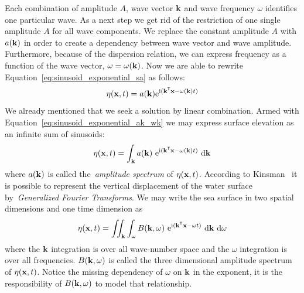Each combination of amplitude $A$, wave vector $\mathbf{k}$ and wave frequency
$\omega$ identifies one particular wave. As a next step we get rid of the
restriction of one single amplitude $A$ for all wave components. We replace the
constant amplitude $A$ with $a(\mathbf{k})$ in order to create a dependency
between wave vector and wave amplitude. Furthermore, because of the dispersion
relation, we can express frequency as a function of the wave vector, $\omega =
\omega(\mathbf{k})$. Now we are able to rewrite
Equation~\ref{eq:sinusoid_exponential_sa} as follows:
\begin{equation}
\label{eq:sinusoid_exponential_ak_wk}
\eta(\mathbf{x}, t) =
a(\mathbf{k})\mathrm{e}^{\mathrm{i}(\mathbf{k}^{\mathsf{T}}\mathbf{x}-
\omega(\mathbf{k})t)}
\end{equation}
%
We already mentioned that we seek a solution by linear combination. Armed with
Equation~\ref{eq:sinusoid_exponential_ak_wk} we may express surface
elevation as an infinite sum of sinusoids:
\begin{equation}
\label{eq:surface_elevation_akwt}
 \eta(\mathbf{x}, t) = \int_{\mathbf{k}}
a(\mathbf{k})~\mathrm{e}^{\mathrm{i}(\mathbf{k}^{\mathsf{T}}\mathbf{x}-
\omega(\mathbf{k})t)}~\mathrm{d}\mathbf{k}
\end{equation}
where $a(\mathbf{k})$ is called the~\emph{amplitude spectrum} of
$\eta(\mathbf{x}, t)$. According to Kinsman~\cite{book:kinsman2002wind} it is possible to
represent the vertical displacement of the water surface by~\emph{Generalized
Fourier Transforms}. We may write the sea surface in two spatial dimensions and
one time dimension as
%
\begin{equation}
\label{eq:surface_elevation_bkwt}
 \eta(\mathbf{x}, t) = \iint_{\mathbf{k}}\int_{\omega} B(\mathbf{k},
\omega)~\mathrm{e}^{\mathrm{i}(\mathbf{k}^{\mathsf{T}}\mathbf{x}-
\omega t)}~
\mathrm{d}\mathbf{k}~\mathrm{d}\omega
\end{equation}
where the $\mathbf{k}$ integration is over all wave-number space and the $\omega$
integration is over all frequencies. $B(\mathbf{k},\omega)$ is called the
three dimensional amplitude spectrum of $\eta(\mathbf{x}, t)$. Notice the missing
dependency of $\omega$ on $\mathbf{k}$ in the exponent, it is the responsibility
of $B(\mathbf{k},\omega)$ to model that relationship.\\

